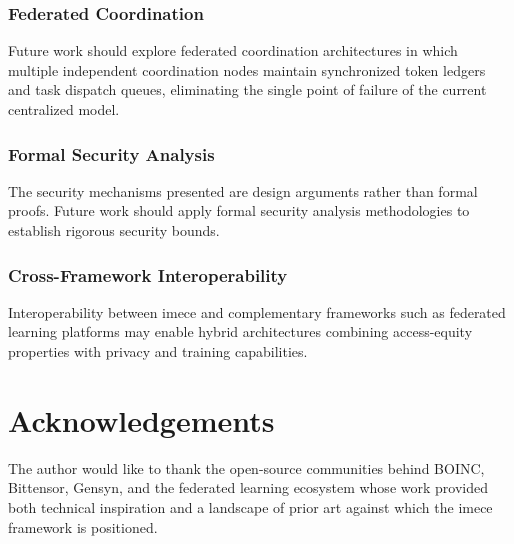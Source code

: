 \documentclass[12pt]{article}
\begin{document}
\subsubsection{Federated Coordination}

Future work should explore federated coordination architectures in which multiple independent coordination nodes maintain synchronized token ledgers and task dispatch queues, eliminating the single point of failure of the current centralized model.

\subsubsection{Formal Security Analysis}

The security mechanisms presented are design arguments rather than formal proofs. Future work should apply formal security analysis methodologies to establish rigorous security bounds.

\subsubsection{Cross-Framework Interoperability}

Interoperability between imece and complementary frameworks such as federated learning platforms may enable hybrid architectures combining access-equity properties with privacy and training capabilities.

\section*{Acknowledgements}

The author would like to thank the open-source communities behind BOINC, Bittensor, Gensyn, and the federated learning ecosystem whose work provided both technical inspiration and a landscape of prior art against which the imece framework is positioned.
\end{document}

